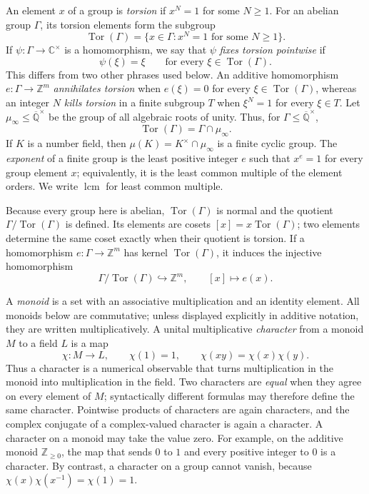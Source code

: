 \documentclass[11pt]{article}
\theoremstyle{plain}
\theoremstyle{definition}
\theoremstyle{remark}
\newcommand{\AlgNums}{\overline{\mathbb Q}}
\DeclareMathOperator{\Tor}{Tor}
\DeclareMathOperator{\lcm}{lcm}
\begin{document}
An element $x$ of a group is \emph{torsion} if $x^N=1$ for some $N\ge1$.
For an abelian group $\Gamma$, its torsion elements form the subgroup
\[
  \Tor(\Gamma)=\{x\in\Gamma:x^N=1\text{ for some }N\ge1\}.
\]
If $\psi:\Gamma\to\mathbb C^\times$ is a homomorphism, we say that
$\psi$ \emph{fixes torsion pointwise} if
\begin{equation}
  \psi(\xi)=\xi
  \qquad\text{for every }\xi\in\Tor(\Gamma).
  \label{eq:fixes-torsion-definition}
\end{equation}
This differs from two other phrases used below.  An additive homomorphism
$e:\Gamma\to\mathbb Z^m$ \emph{annihilates torsion} when
$e(\xi)=0$ for every $\xi\in\Tor(\Gamma)$, whereas an integer $N$
\emph{kills torsion} in a finite subgroup $T$ when $\xi^N=1$ for every
$\xi\in T$.
Let $\mu_\infty\le\AlgNums^\times$ be the group of all algebraic roots of
unity.  Thus, for $\Gamma\le\AlgNums^\times$,
\begin{equation*}
  \Tor(\Gamma)=\Gamma\cap\mu_\infty.
\end{equation*}
If $K$ is a number field, then
$\mu(K)=K^\times\cap\mu_\infty$ is a finite cyclic group.  The
\emph{exponent} of a finite group is the least positive integer $e$ such
that $x^e=1$ for every group element $x$; equivalently, it is the least
common multiple of the element orders.  We write $\lcm$ for least common
multiple.

Because every group here is abelian, $\Tor(\Gamma)$ is normal and the
quotient $\Gamma/\Tor(\Gamma)$ is defined.  Its elements are cosets
$[x]=x\Tor(\Gamma)$; two elements determine the same coset exactly when
their quotient is torsion.  If a homomorphism
$e:\Gamma\to\mathbb Z^m$ has kernel $\Tor(\Gamma)$, it induces the
injective homomorphism
\[
  \Gamma/\Tor(\Gamma)\hookrightarrow\mathbb Z^m,
  \qquad [x]\longmapsto e(x).
\]

A \emph{monoid} is a set with an associative multiplication and an identity
element.  All monoids below are commutative; unless displayed explicitly in
additive notation, they are written multiplicatively.
A unital multiplicative \emph{character} from a monoid $M$ to a field $L$ is
a map
\[
  \chi:M\to L,
  \qquad
  \chi(1)=1,
  \qquad
  \chi(xy)=\chi(x)\chi(y).
\]
Thus a character is a numerical observable that turns multiplication in the
monoid into multiplication in the field.  Two characters are \emph{equal}
when they agree on every element of $M$; syntactically different formulas
may therefore define the same character.  Pointwise products of characters
are again characters, and the complex conjugate of a complex-valued
character is again a character.  A character on a monoid may take the value
zero.  For example, on the additive monoid $\mathbb Z_{\ge0}$, the map that sends
$0$ to $1$ and every positive integer to $0$ is a character.  By contrast,
a character on a group cannot vanish, because
$\chi(x)\chi(x^{-1})=\chi(1)=1$.
\end{document}
